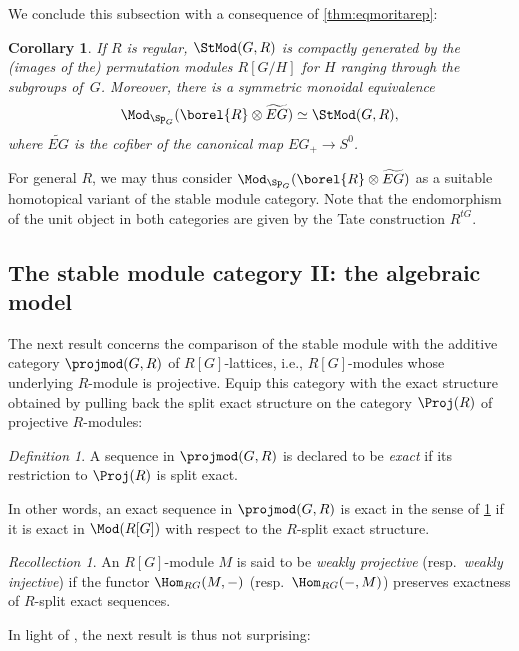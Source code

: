 \documentclass{amsart}%
\numberwithin{equation}{section}%
\newtheorem{Cor}[equation]{Corollary}
\theoremstyle{remark}
\newtheorem{Def}[equation]{Definition}
\newtheorem{Rec}[equation]{Recollection}
\begin{document}
We conclude this subsection with a consequence of \cref{thm:eqmoritarep}:

\begin{Cor}\label{cor:eqmoritastmod}
If $R$ is regular, $\StMod(G,R)$ is compactly generated by the (images of the) permutation modules $R[G/H]$ for $H$ ranging through the subgroups of~$G$. Moreover, there is a symmetric monoidal equivalence
\[
\Mod_{\Sp_G}(\borel{R} \otimes \widetilde{EG}) \simeq \StMod(G,R),
\]
where $\widetilde{EG}$ is the cofiber of the canonical map $EG_+ \to S^0$. 
\end{Cor}

For general $R$, we may thus consider $\Mod_{\Sp_G}(\borel{R} \otimes \widetilde{EG})$ as a suitable homotopical variant of the stable module category. Note that the endomorphism of the unit object in both categories are given by the Tate construction $R^{tG}$.


\subsection{The stable module category II: the algebraic model}

The next result concerns the comparison of the stable module with the additive category $\projmod(G,R)$ of $R[G]$-lattices, i.e., $R[G]$-modules whose underlying $R$-module is projective. Equip this category with the exact structure obtained by pulling back the split exact structure on the category $\Proj(R)$ of projective $R$-modules:

\begin{Def}\label{def:exactstructure}
A sequence in $\projmod(G,R)$ is declared to be \emph{exact} if its restriction to $\Proj(R)$ is split exact. 
\end{Def}

In other words, an exact sequence in $\projmod(G,R)$ is exact in the sense of \cref{def:exactstructure} if it is exact in $\Mod(R[G])$ with respect to the $R$-split exact structure.

\begin{Rec}
An $R[G]$-module $M$ is said to be \emph{weakly projective} (resp.~\emph{weakly injective}) if the functor $\Hom_{RG}(M,-)$ (resp.~$\Hom_{RG}(-,M)$) preserves exactness of $R$-split exact sequences. 
\end{Rec}

In light of \cite[Sec.~2]{BensonIyengarKrause13}, the next result is thus not surprising:
\end{document}

